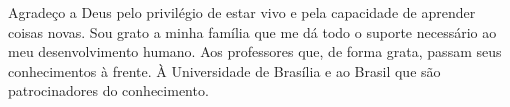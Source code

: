 Agradeço a Deus pelo privilégio de estar vivo e pela capacidade de aprender coisas novas. Sou grato a minha família que me dá todo o suporte
necessário ao meu desenvolvimento humano. Aos professores que, de forma grata, passam seus conhecimentos à frente. À Universidade de Brasília e ao Brasil que são patrocinadores do conhecimento. 
 